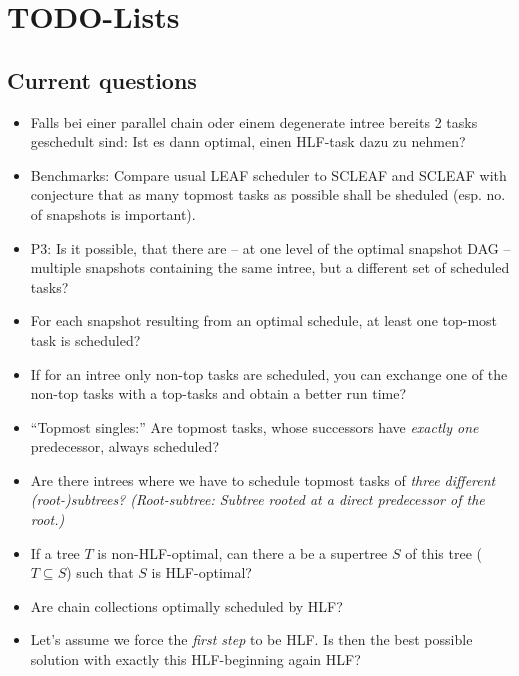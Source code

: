 \documentclass[a4paper, 11pt]{report}
\begin{document}
\chapter{TODO-Lists}
\label{chap:todo}

\section{Current questions}
\label{chap:current-questions}

\begin{itemize}
\item Falls bei einer parallel chain oder einem degenerate intree bereits 2 tasks geschedult sind: Ist es dann optimal, einen HLF-task dazu zu nehmen?
\item Benchmarks: Compare usual LEAF scheduler to SCLEAF and SCLEAF with conjecture that as many topmost tasks as possible shall be sheduled (esp. no. of snapshots is important).
\item P3: Is it possible, that there are -- at one level of the optimal snapshot DAG -- multiple snapshots containing the same intree, but a different set of scheduled tasks? 
\item For each snapshot resulting from an optimal schedule, at least one top-most task is scheduled? 
\item If for an intree only non-top tasks are scheduled, you can exchange one of the non-top tasks with a top-tasks and obtain a better run time?
\item ``Topmost singles:'' Are topmost tasks, whose successors have \emph{exactly one} predecessor, always scheduled?
\item Are there intrees where we have to schedule topmost tasks of \emph{three different (root-)subtrees? (Root-subtree: Subtree rooted at a direct predecessor of the root.)}
\item If a tree $T$ is non-HLF-optimal, can there a be a supertree $S$ of this tree ($T\subseteq S$) such that $S$ is HLF-optimal? 
\item Are chain collections optimally scheduled by HLF?
\item Let's assume we force the \emph{first step} to be HLF. Is then the best possible solution with exactly this HLF-beginning again HLF?
\end{itemize}
\end{document}

